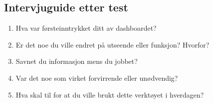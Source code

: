 \subsection*{Intervjuguide etter test}
\begin{enumerate}[nosep]
  \item Hva var førsteinntrykket ditt av dashboardet?
  \item Er det noe du ville endret på utseende eller funksjon? Hvorfor?
  \item Savnet du informasjon mens du jobbet?
  \item Var det noe som virket forvirrende eller unødvendig?
  \item Hva skal til for at du ville brukt dette verktøyet i hverdagen?
\end{enumerate}
